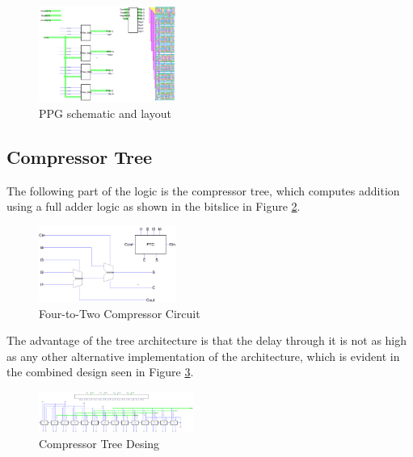 \documentclass[journal]{IEEEtran}
\begin{document}
\newpage

\begin{figure}[h!]
  \centering
  \includegraphics[width=0.4\textwidth]{5.png}
  \centering
  \caption{PPG schematic and layout}
  \label{fig:5}
\end{figure}

\vspace{-10pt}

\subsection{Compressor Tree}

The following part of the logic is the compressor tree, which computes addition using a full adder logic as shown in the bitslice in Figure \ref{fig:6}.

\begin{figure}[h!]
  \centering
  \includegraphics[width=0.4\textwidth]{6.png}
  \centering
  \caption{Four-to-Two Compressor Circuit}
  \label{fig:6}
\end{figure}


The advantage of the tree architecture is that the delay through it is not as high as any other alternative implementation of the architecture, which is evident in the combined design seen in Figure \ref{fig:7}.

\begin{figure}[h!]
  \centering
  \includegraphics[width=0.45\textwidth]{7.png}
  \centering
  \caption{Compressor Tree Desing}
  \label{fig:7}
\end{figure}
\end{document}
